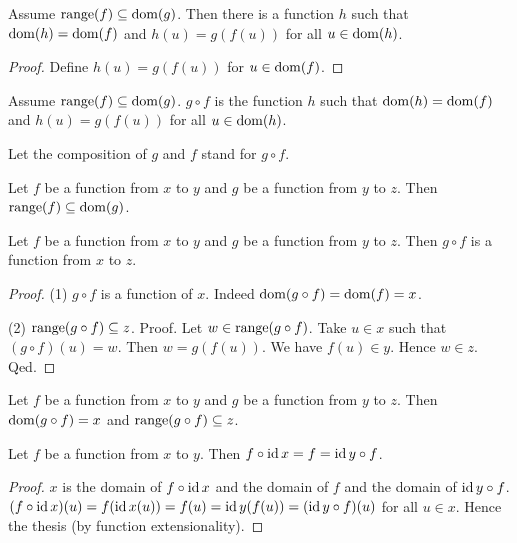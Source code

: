 \documentclass[../../sets-and-functions.ftl.tex]{subfiles}
\begin{document}
  \begin{forthel}
    \begin{lemma}
      Assume $\operatorname{range}(f) \subseteq \operatorname{dom}(g)$.
      Then there is a function $h$ such that $\operatorname{dom}(h) = \operatorname{dom}(f)$ and $h(u) = g(f(u))$ for all $u \in \operatorname{dom}(h)$.
    \end{lemma}
    \begin{proof}
      Define $h(u) = g(f(u))$ for $u \in \operatorname{dom}(f)$.
    \end{proof}

    \begin{definition}
      Assume $\operatorname{range}(f) \subseteq \operatorname{dom}(g)$.
      $g \circ f$ is the function $h$ such that $\operatorname{dom}(h) = \operatorname{dom}(f)$ and $h(u) = g(f(u))$ for all $u \in \operatorname{dom}(h)$.
    \end{definition}

    Let the composition of $g$ and $f$ stand for $g \circ f$.

    \begin{lemma}
      Let $f$ be a function from $x$ to $y$ and $g$ be a function from $y$ to $z$.
      Then $\operatorname{range}(f) \subseteq \operatorname{dom}(g)$.
    \end{lemma}

    \begin{proposition}[SF 02 01 289732]
      Let $f$ be a function from $x$ to $y$ and $g$ be a function from $y$ to $z$.
      Then $g \circ f$ is a function from $x$ to $z$.
    \end{proposition}
    \begin{proof}
      (1) $g \circ f$ is a function of $x$.
      Indeed $\operatorname{dom}(g \circ f) = \operatorname{dom}(f) = x$.

      (2) $\operatorname{range}(g \circ f) \subseteq z$.
      Proof.
        Let $w \in \operatorname{range}(g \circ f)$.
        Take $u \in x$ such that $(g \circ f)(u) = w$.
        Then $w = g(f(u))$.
        We have $f(u) \in y$.
        Hence $w \in z$.
      Qed.
    \end{proof}

    \begin{lemma}
      Let $f$ be a function from $x$ to $y$ and $g$ be a function from $y$ to $z$.
      Then $\operatorname{dom}(g \circ f) = x$ and $\operatorname{range}(g \circ f) \subseteq z$.
    \end{lemma}

    \begin{proposition}[SF 02 01 718601]
      Let $f$ be a function from $x$ to $y$.
      Then $f \circ \operatorname{id}{x} = f = \operatorname{id}{y} \circ f$.
    \end{proposition}
    \begin{proof}
      $x$ is the domain of $f \circ \operatorname{id}{x}$ and the domain of $f$ and the domain of $\operatorname{id}{y} \circ f$.
      $(f \circ \operatorname{id}{x})(u) = f(\operatorname{id}{x}(u)) = f(u) = \operatorname{id}{y}(f(u)) = (\operatorname{id}{y} \circ f)(u)$ for all $u \in x$.
      Hence the thesis (by function extensionality).
    \end{proof}


\end{forthel}
\end{document}
